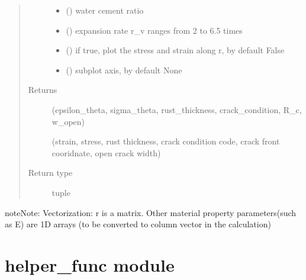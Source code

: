 \documentclass[letterpaper,10pt,english]{sphinxmanual}
\begin{document}
\begin{fulllineitems}
\begin{quote}
\begin{description}
\begin{itemize}
\item {} 
\sphinxAtStartPar
{} (\sphinxstyleliteralemphasis{\sphinxupquote{, }}) \textendash{} water cement ratio

\item {} 
\sphinxAtStartPar
{} () \textendash{} expansion rate r\_v ranges from 2 to 6.5 times

\item {} 
\sphinxAtStartPar
{} (\sphinxstyleliteralemphasis{\sphinxupquote{, }}) \textendash{} if true, plot the stress and strain along r, by default False

\item {} 
\sphinxAtStartPar
{} () \textendash{} subplot axis, by default None

\end{itemize}

\item[{Returns}] \leavevmode
\sphinxAtStartPar

\sphinxAtStartPar
(epsilon\_theta, sigma\_theta, rust\_thickness,
crack\_condition, R\_c, w\_open)

\sphinxAtStartPar
(strain, stress, rust thickness,
crack condition code, crack front cooridnate, open crack width)


\item[{Return type}] \leavevmode
\sphinxAtStartPar
tuple

\end{description}\end{quote}

\begin{sphinxadmonition}{note}{Note:}
\sphinxAtStartPar
Vectorization:
r is a matrix. Other material property parameters(such as E) are 1\sphinxhyphen{}D arrays (to be converted to column vector in the calculation)
\end{sphinxadmonition}

\end{fulllineitems}



\section{helper\_func module}
\label{\detokenize{helper_func:module-helper_func}}\label{\detokenize{helper_func:helper-func-module}}\label{\detokenize{helper_func::doc}}
\end{document}
